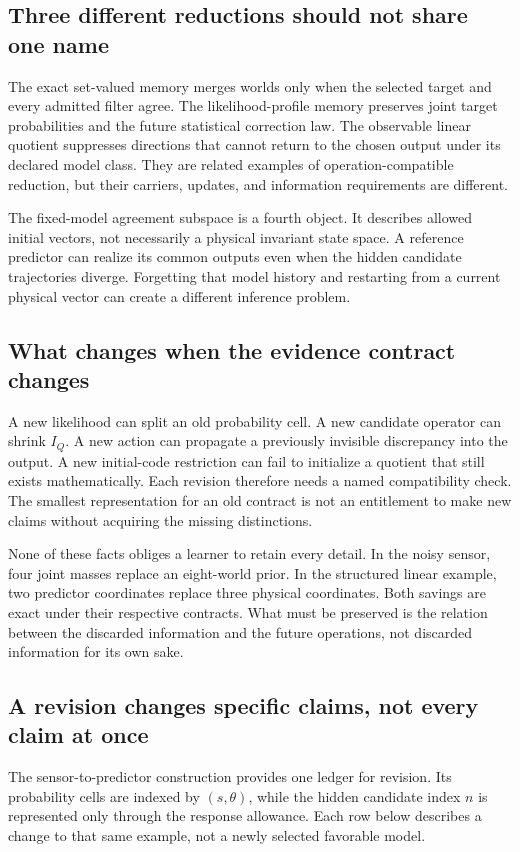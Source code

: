\documentclass[11pt,letterpaper]{article}
\theoremstyle{plain}
\theoremstyle{definition}
\begin{document}
\subsection{Three different reductions should not share one name}
The exact set-valued memory merges worlds only when the selected target and every admitted filter agree. The likelihood-profile memory preserves joint target probabilities and the future statistical correction law. The observable linear quotient suppresses directions that cannot return to the chosen output under its declared model class. They are related examples of operation-compatible reduction, but their carriers, updates, and information requirements are different.

The fixed-model agreement subspace is a fourth object. It describes allowed initial vectors, not necessarily a physical invariant state space. A reference predictor can realize its common outputs even when the hidden candidate trajectories diverge. Forgetting that model history and restarting from a current physical vector can create a different inference problem.

\subsection{What changes when the evidence contract changes}
A new likelihood can split an old probability cell. A new candidate operator can shrink $I_Q$. A new action can propagate a previously invisible discrepancy into the output. A new initial-code restriction can fail to initialize a quotient that still exists mathematically. Each revision therefore needs a named compatibility check. The smallest representation for an old contract is not an entitlement to make new claims without acquiring the missing distinctions.

None of these facts obliges a learner to retain every detail. In the noisy sensor, four joint masses replace an eight-world prior. In the structured linear example, two predictor coordinates replace three physical coordinates. Both savings are exact under their respective contracts. What must be preserved is the relation between the discarded information and the future operations, not discarded information for its own sake.

\subsection{A revision changes specific claims, not every claim at once}
The sensor-to-predictor construction provides one ledger for revision. Its probability cells are indexed by $(s,\theta)$, while the hidden candidate index $n$ is represented only through the response allowance. Each row below describes a change to that same example, not a newly selected favorable model.
\end{document}

